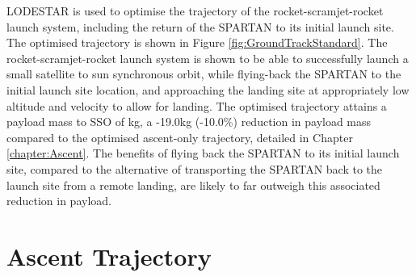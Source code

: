 LODESTAR is used to optimise the trajectory of the rocket-scramjet-rocket launch system, including the return of the SPARTAN to its initial launch site. The optimised trajectory is shown in Figure \ref{fig:GroundTrackStandard}. 
The rocket-scramjet-rocket launch system is shown to be able to successfully launch a small satellite to sun synchronous orbit, 
while flying-back the SPARTAN to the initial launch site location, and approaching the landing site at appropriately low altitude and velocity to allow for landing. 
The optimised trajectory attains a payload mass to SSO of \PayloadToOrbitStandard kg, a -19.0kg (-10.0\%) reduction in payload mass compared to the optimised ascent-only trajectory, detailed in Chapter \ref{chapter:Ascent}. 
The benefits of flying back the SPARTAN to its initial launch site, compared to the alternative of transporting the SPARTAN back to the launch site from a remote landing, are likely to far outweigh this associated reduction in payload. 



\section{Ascent Trajectory}

